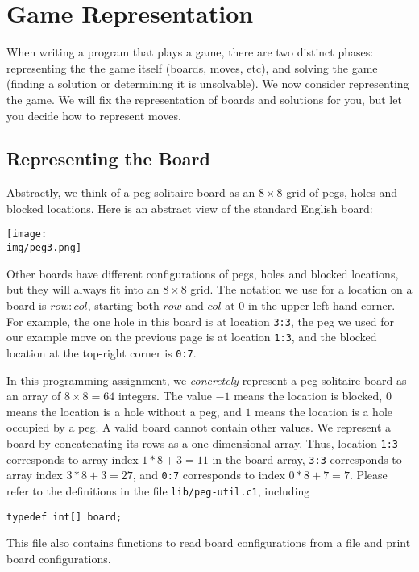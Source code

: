 \documentclass[12pt]{exam}
\begin{document}
\section{Game Representation}

When writing a program that plays a game, there are two distinct
phases: representing the the game itself (boards, moves, etc), and
solving the game (finding a solution or determining it is unsolvable).
We now consider representing the game.  We will fix the representation
of boards and solutions for you, but let you decide how to represent
moves.


\subsection{Representing the Board}

Abstractly, we think of a peg solitaire board as an $8 \times 8$ grid
of pegs, holes and blocked locations.  Here is an abstract view of the
standard English board:
\begin{center}
\texttt{[image: \\img/peg3.png]}
\end{center}
Other boards have different configurations of pegs, holes and blocked
locations, but they will always fit into an $8 \times 8$ grid.  The
notation we use for a location on a board is $\mathit{row} {:}
\mathit{col}$, starting both $\mathit{row}$ and $\mathit{col}$ at 0 in
the upper left-hand corner.  For example, the one hole in this board
is at location \lstinline'3:3', the peg we used for our example move
on the previous page is at location \lstinline'1:3', and the blocked
location at the top-right corner is \lstinline'0:7'.

In this programming assignment, we \emph{concretely} represent a peg
solitaire board as an array of $8 \times 8 = 64$ integers.  The value
$-1$ means the location is blocked, $0$ means the location is a hole
without a peg, and $1$ means the location is a hole occupied by a peg.
A valid board cannot contain other values.  We represent a board by
concatenating its rows as a one-dimensional array.  Thus, location
\lstinline'1:3' corresponds to array index $1*8+3 = 11$ in the board
array, \lstinline'3:3' corresponds to array index $3*8+3 = 27$, and
\lstinline'0:7' corresponds to index $0*8+7 = 7$.  Please refer to the
definitions in the file \lstinline'lib/peg-util.c1', including
\begin{lstlisting}
typedef int[] board;
\end{lstlisting}
This file also contains functions to read board configurations from a
file and print board configurations.
\end{document}
